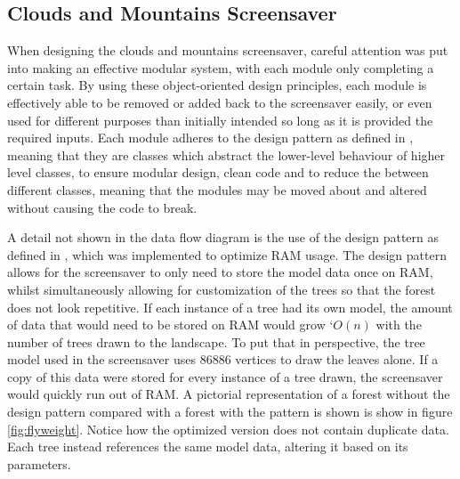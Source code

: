 \documentclass[10pt, openany]{book}
\begin{document}
\subsection{Clouds and Mountains Screensaver}
When designing the clouds and mountains screensaver, careful attention was put into making an effective modular system, with each module only completing a certain task. By using these object-oriented design principles, each module is effectively able to be removed or added back to the screensaver easily, or even used for different purposes than initially intended so long as it is provided the required inputs. Each module adheres to the \textit{} design pattern as defined in \citep{nystrom2014game}, meaning that they are classes which abstract the lower-level behaviour of higher level classes, to ensure modular design, clean code and to reduce the  between different classes, meaning that the modules may be moved about and altered without causing the code to break. 

A detail not shown in the data flow diagram is the use of the \textit{} design pattern as defined in \citep{gamma1995design}, which was implemented to optimize RAM usage. The \textit{} design pattern allows for the screensaver to only need to store the model data once on RAM, whilst simultaneously allowing for customization of the trees so that the forest does not look repetitive. If each instance of a tree had its own model, the amount of data that would need to be stored on RAM would grow `$O(n)$ with the number of trees drawn to the landscape. To put that in perspective, the tree model used in the screensaver uses 86886 vertices to draw the leaves alone. If a copy of this data were stored for every instance of a tree drawn, the screensaver would quickly run out of RAM. A pictorial representation of a forest without the \textit{} design pattern compared with a forest with the pattern is shown is show in figure \ref{fig:flyweight}. Notice how the optimized version does not contain duplicate data. Each tree instead references the same model data, altering it based on its parameters.
\end{document}
